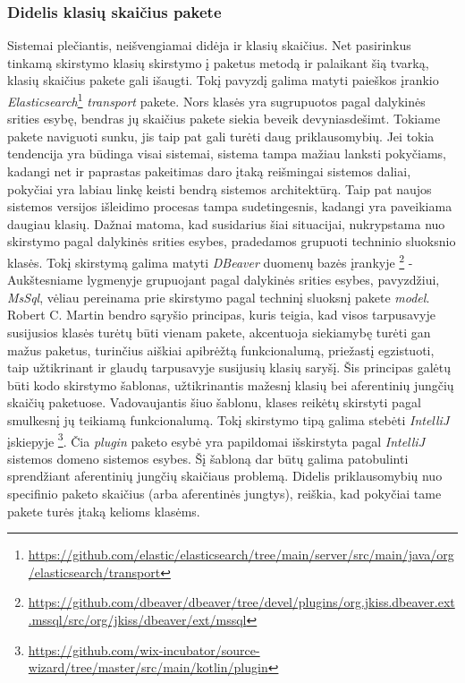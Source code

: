 \subsubsection{Didelis klasių skaičius pakete}
Sistemai plečiantis, neišvengiamai didėja ir klasių skaičius. Net pasirinkus tinkamą skirstymo klasių skirstymo į paketus metodą
ir palaikant šią tvarką, klasių skaičius pakete gali išaugti. Tokį pavyzdį galima matyti paieškos įrankio \textit{Elasticsearch}\footnote{\url{https://github.com/elastic/elasticsearch/tree/main/server/src/main/java/org/elasticsearch/transport}}
\textit{transport} pakete. Nors klasės yra sugrupuotos pagal dalykinės srities esybę, bendras jų skaičius pakete siekia beveik devyniasdešimt.
Tokiame pakete naviguoti sunku, jis taip pat gali turėti daug priklausomybių.
Jei tokia tendencija yra būdinga visai sistemai, sistema tampa mažiau lanksti pokyčiams, kadangi net ir paprastas pakeitimas
daro įtaką reišmingai sistemos daliai, pokyčiai yra labiau linkę keisti bendrą sistemos architektūrą.
Taip pat naujos sistemos versijos išleidimo  procesas tampa sudetingesnis, kadangi yra paveikiama daugiau klasių.
Dažnai matoma, kad susidarius šiai situacijai, nukrypstama nuo skirstymo pagal dalykinės srities esybes, pradedamos grupuoti
techninio sluoksnio klasės. Tokį skirstymą galima matyti \textit{DBeaver} duomenų bazės įrankyje \footnote{\url{https://github.com/dbeaver/dbeaver/tree/devel/plugins/org.jkiss.dbeaver.ext.mssql/src/org/jkiss/dbeaver/ext/mssql}} -
Aukštesniame lygmenyje grupuojant pagal dalykinės srities esybes, pavyzdžiui, \textit{MsSql}, vėliau pereinama prie skirstymo
pagal techninį sluoksnį pakete \textit{model}.
Robert C. Martin bendro sąryšio principas, kuris teigia, kad visos tarpusavyje susijusios klasės turėtų būti vienam pakete,
akcentuoja siekiamybę turėti gan mažus paketus, turinčius aiškiai apibrėžtą funkcionalumą, priežastį egzistuoti, taip užtikrinant ir
glaudų tarpusavyje susijusių klasių saryšį.
Šis principas galėtų būti kodo skirstymo šablonas, užtikrinantis mažesnį klasių bei aferentinių jungčių skaičių paketuose.
Vadovaujantis šiuo šablonu, klases reikėtų skirstyti pagal smulkesnį jų teikiamą funkcionalumą.
Tokį skirstymo tipą galima stebėti \textit{IntelliJ} įskiepyje \footnote{\url{https://github.com/wix-incubator/source-wizard/tree/master/src/main/kotlin/plugin}}.
Čia \textit{plugin} paketo esybė yra papildomai išskirstyta pagal \textit{IntelliJ} sistemos domeno sistemos esybes.
Šį šabloną dar būtų galima patobulinti sprendžiant aferentinių jungčių skaičiaus problemą.
Didelis priklausomybių nuo specifinio paketo skaičius (arba aferentinės jungtys), reiškia, kad pokyčiai tame pakete turės įtaką kelioms klasėms.
